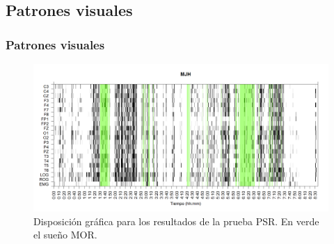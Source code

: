 \documentclass{beamer}
\begin{document}

\subsection{Patrones visuales}

\begin{frame}\frametitle{Patrones visuales}
\begin{figure}
\includegraphics[width=\textwidth]
{./g170413/MJNNVIGILOS_est.png}
\caption{Disposici\'on gr\'afica para los resultados de la prueba PSR. En verde el sue\~no MOR.}
\end{figure}
\end{frame}

\end{document}
